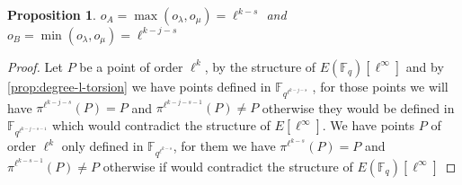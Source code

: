\documentclass{lms}
\newcommand{\todo}[1]{{\color{red}TODO: #1}}
\newtheorem{prop}[thm]{Proposition}
\begin{document}
\begin{prop}
$o_A=\max(o_{\lambda},o_{\mu}) = \ell^{k-s}$ and $o_B=\min(o_{\lambda},o_{\mu}) = \ell^{k-j-s}$
\end{prop}

\begin{proof}

 Let $P$ be a point of order $\ell^k$, by the structure of $E(\mathbb{F}_q)[\ell^{\infty}]$ and by \ref{prop:degree-l-torsion} we have points defined in $\mathbb{F}_{q^{\ell^{k-j-s}}}$ , for those points we will have $\pi^{\ell^{k-j-s}}(P)=P$ and $\pi^{\ell^{k-j-s-1}}(P) \neq P$ otherwise they would be defined in $\mathbb{F}_{q^{\ell^{k-j-s-1}}}$ which would contradict the structure of $E[\ell^{\infty}]$. We have points $P$ of order $\ell^k$ only defined in $\mathbb{F}_{q^{\ell^{k-s}}}$, for them we have $\pi^{\ell^{k-s}}(P)=P$ and $\pi^{\ell^{k-s-1}}(P) \neq P$ otherwise if would contradict the structure of $E(\mathbb{F}_q)[\ell^{\infty}]$
\end{proof}

\end{document}
